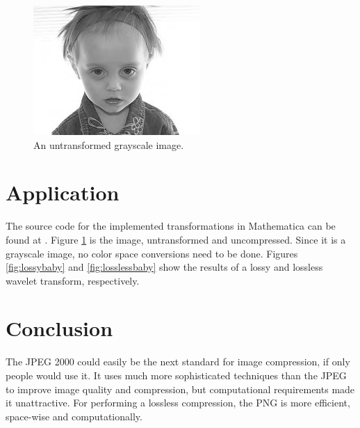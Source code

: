 \documentclass[12pt]{article}
\begin{document}

\begin{figure}
	\centering
	\includegraphics{resources/baby.png}
	\caption{An untransformed grayscale image.}
	\label{fig:original}
\end{figure}


\section{Application}

The source code for the implemented transformations in Mathematica can be found at \cite{implement}.
Figure \ref{fig:original} is the image, untransformed and uncompressed.
Since it is a grayscale image, no color space conversions need to be done.
Figures \ref{fig:lossybaby} and \ref{fig:losslessbaby} show the results of a lossy and lossless 
wavelet transform, respectively.


\section{Conclusion}

The JPEG 2000 could easily be the next standard for image compression, if only people would use it.
It uses much more sophisticated techniques than the JPEG to improve image quality and compression,
but computational requirements made it unattractive.
For performing a lossless compression, the PNG is more efficient, space-wise and computationally.


\printbibliography[]
\end{document}
